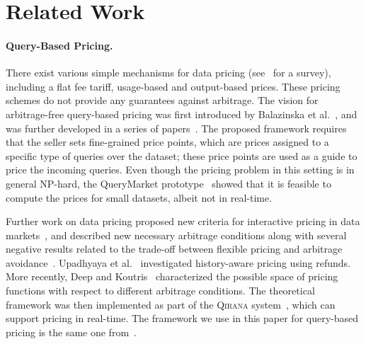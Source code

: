 \section{Related Work}
\label{sec:related}


\paragraph{Query-Based Pricing.}
There exist various simple mechanisms for data pricing (see~\cite{muschalle2012pricing} for a survey), including a flat fee tariff, usage-based and output-based prices. 
These pricing schemes do not provide any guarantees against arbitrage.
%
The vision for arbitrage-free query-based pricing was first introduced by Balazinska et al.~\cite{balazinska:11b}, and was further developed in a series of papers~\cite{KUBHS12,KUBHS13,KUBHS12b}. The proposed framework requires that the seller sets fine-grained price points, which are prices assigned to a specific type of queries
over the dataset; these price points are used as a guide to price the incoming queries. 
Even though the pricing problem in this setting is in general NP-hard, the QueryMarket prototype~\cite{KUBHS13} showed that it is feasible to compute the prices for small datasets, albeit not in real-time. 


Further work on data pricing proposed new criteria for interactive pricing in data markets~\cite{LM12}, and described new necessary arbitrage conditions along with several negative results related to the trade-off between flexible pricing and arbitrage avoidance~\cite{LK14}. Upadhyaya et al.~\cite{Upadhyaya2016} investigated history-aware pricing using refunds. More recently, Deep and Koutris~\cite{deep2016design} characterized the possible space of pricing functions with respect to different arbitrage conditions. The theoretical framework was then implemented as part of the \textsc{Qirana} system~\cite{deep2017qirana}, which can support pricing in real-time. The framework we use in this paper for query-based pricing is the same one from~\cite{deep2017qirana}. 


